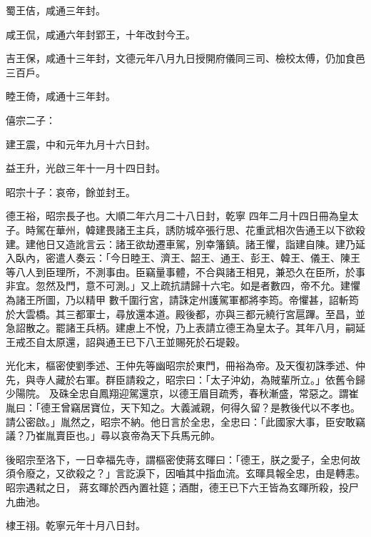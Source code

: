 \begin{pinyinscope}
 蜀王佶，咸通三年封。



 咸王侃，咸通六年封郢王，十年改封今王。



 吉王保，咸通十三年封，文德元年八月九日授開府儀同三司、檢校太傅，仍加食邑三百戶。



 睦王倚，咸通十三年封。



 僖宗二子：



 建王震，中和元年九月十六日封。



 益王升，光啟三年十一月十四日封。



 昭宗十子：哀帝，餘並封王。



 德王裕，昭宗長子也。大順二年六月二十八日封，乾寧
 四年二月十四日冊為皇太子。時駕在華州，韓建畏諸王主兵，誘防城卒張行思、花重武相次告通王以下欲殺建。建他日又造訛言云：諸王欲劫遷車駕，別幸籓鎮。諸王懼，詣建自陳。建乃延入臥內，密遣人奏云：「今日睦王、濟王、韶王、通王、彭王、韓王、儀王、陳王等八人到臣理所，不測事由。臣竊量事體，不合與諸王相見，兼恐久在臣所，於事非宜。忽然及門，意不可測。」又上疏抗請歸十六宅。如是者數四，帝不允。建懼為諸王所圖，乃以精甲
 數千圍行宮，請誅定州護駕軍都將李筠。帝懼甚，詔斬筠於大雲橋。其三都軍士，尋放還本道。殿後都，亦與三都元繞行宮扈蹕。至昌，並急詔散之。罷諸王兵柄。建慮上不悅，乃上表請立德王為皇太子。其年八月，嗣延王戒丕自太原還，詔與通王已下八王並賜死於石堤穀。



 光化末，樞密使劉季述、王仲先等幽昭宗於東門，冊裕為帝。及天復初誅季述、仲先，與寺人藏於右軍。群臣請殺之，昭宗曰：「太子沖幼，為賊輩所立。」依舊令歸少陽院。
 及硃全忠自鳳翔迎駕還京，以德王眉目疏秀，春秋漸盛，常惡之。謂崔胤曰：「德王曾竊居寶位，天下知之。大義滅親，何得久留？是教後代以不孝也。請公密啟。」胤然之，昭宗不納。他日言於全忠，全忠曰：「此國家大事，臣安敢竊議？乃崔胤賣臣也。」尋以哀帝為天下兵馬元帥。



 後昭宗至洛下，一日幸福先寺，謂樞密使蔣玄暉曰：「德王，朕之愛子，全忠何故須令廢之，又欲殺之？」言訖淚下，因嚙其中指血流。玄暉具報全忠，由是轉恚。昭宗遇弒之日，
 蔣玄暉於西內置社筵；酒酣，德王已下六王皆為玄暉所殺，投尸九曲池。



 棣王祤。乾寧元年十月八日封。




\end{pinyinscope}
